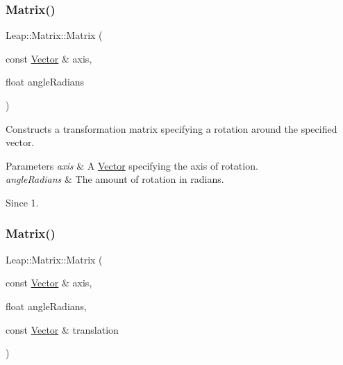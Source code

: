 \subsubsection{\texorpdfstring{Matrix()}{Matrix()}\hspace{0.1cm}{\footnotesize\ttfamily [5/6]}}
{\footnotesize\ttfamily Leap\+::\+Matrix\+::\+Matrix (\begin{DoxyParamCaption}\item[{const \hyperlink{struct_leap_1_1_vector}{Vector} \&}]{axis,  }\item[{float}]{angle\+Radians }\end{DoxyParamCaption})\hspace{0.3cm}{\ttfamily [inline]}}

Constructs a transformation matrix specifying a rotation around the specified vector.


\begin{DoxyCodeInclude}
\end{DoxyCodeInclude}



\begin{DoxyParams}{Parameters}
{\em axis} & A \hyperlink{struct_leap_1_1_vector}{Vector} specifying the axis of rotation. \\
\hline
{\em angle\+Radians} & The amount of rotation in radians. \\
\hline
\end{DoxyParams}
\begin{DoxySince}{Since}
1. 
\end{DoxySince}
\mbox{\label{struct_leap_1_1_matrix_ac0004234bfba1a275a062725b8c56572}} 
\subsubsection{\texorpdfstring{Matrix()}{Matrix()}\hspace{0.1cm}{\footnotesize\ttfamily [6/6]}}
{\footnotesize\ttfamily Leap\+::\+Matrix\+::\+Matrix (\begin{DoxyParamCaption}\item[{const \hyperlink{struct_leap_1_1_vector}{Vector} \&}]{axis,  }\item[{float}]{angle\+Radians,  }\item[{const \hyperlink{struct_leap_1_1_vector}{Vector} \&}]{translation }\end{DoxyParamCaption})\hspace{0.3cm}{\ttfamily [inline]}}

